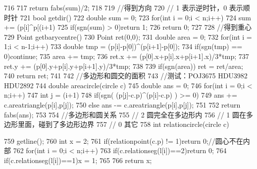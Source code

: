 \documentclass[11pt]{article}
\begin{document}
\begin{Code}
{{{716              }
717              return fabs(sum)/2;
718       }
719       //得到方向
720       // 1 表示逆时针，0 表示顺时针
721       bool getdir(){
722           double sum = 0;
723           for(int i = 0;i < n;i++)
724               sum += (p[i]^p[(i+1)%
725           if(sgn(sum) > 0)return 1;
726           return 0;
727       }
728       //得到重心
729       Point getbarycentre(){
730           Point ret(0,0);
731           double area = 0;
732           for(int i = 1;i < n-1;i++){
733               double tmp = (p[i]-p[0])^(p[i+1]-p[0]);
734               if(sgn(tmp) == 0)continue;
735               area += tmp;
736               ret.x += (p[0].x+p[i].x+p[i+1].x)/3*tmp;
737               ret.y += (p[0].y+p[i].y+p[i+1].y)/3*tmp;
738           }
739           if(sgn(area)) ret = ret/area;
740           return ret;
741       }
742       //多边形和圆交的面积
743       //测试：POJ3675 HDU3982 HDU2892
744       double areacircle(circle c){
745           double ans = 0;
746           for(int i = 0;i < n;i++){
747               int j = (i+1)%
748               if(sgn( (p[j]-c.p)^(p[i]-c.p) ) >= 0)
749                   ans += c.areatriangle(p[i],p[j]);
750               else ans -= c.areatriangle(p[i],p[j]);
751           }
752           return fabs(ans);
753       }
754       //多边形和圆关系
755       // 2 圆完全在多边形内
756       // 1 圆在多边形里面，碰到了多边形边界
757       // 0 其它
758       int relationcircle(circle c){
759           getline();
760           int x = 2;
761           if(relationpoint(c.p) != 1)return 0;//圆心不在内部
762           for(int i = 0;i < n;i++){
763               if(c.relationseg(l[i])==2)return 0;
764               if(c.relationseg(l[i])==1)x = 1;
765           }
766           return x;


}}
\end{Code}
\end{document}
